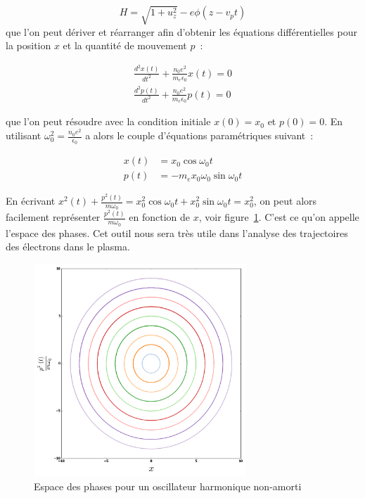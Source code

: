 \documentclass[a4paper]{book}
\begin{document}
\begin{equation}
    H=\sqrt{1+u_z^2}-e\phi(z-v_pt)
\end{equation}
que l'on peut dériver et réarranger afin d'obtenir les équations différentielles pour la position $x$ et la quantité de mouvement $p$~:

\begin{eqnarray}
        \frac{d^2x(t)}{dt^2} +\frac{n_0e^2}{m_e\epsilon_0}x(t)= 0\\
        \frac{d^2p(t)}{dt^2} +\frac{n_0e^2}{m_e\epsilon_0}p(t)= 0
\end{eqnarray}

que l'on peut résoudre avec la condition initiale $x(0)=x_0$ et $p(0)=0$. En utilisant $\omega_0^2=\frac{n_0e^2}{\epsilon_0}$ a alors le couple d'équations paramétriques suivant~:

\begin{eqnarray}
       x(t)&=x_0\cos{\omega_0 t} \\
       p(t)&=-m_ex_0\omega_0\sin{\omega_0 t}
\end{eqnarray}

En écrivant $x^2(t)+\frac{p^2(t)}{m\omega_0}=x_0^2\cos{\omega_0t}+x_0^2\sin{\omega_0t}=x_0^2$, on peut alors facilement représenter $\frac{p^2(t)}{m\omega_0}$ en fonction de $x$, voir figure~\ref{fig:espace_phases}. C'est ce qu'on appelle l'espace des phases. Cet outil nous sera très utile dans l'analyse des trajectoires des électrons dans le plasma. 


\begin{figure}[!htbp]
\begin{center}
\includegraphics[width=8cm]{simple_phase_space.png}
\end{center}
\caption{Espace des phases pour un oscillateur harmonique non-amorti}
\label{fig:espace_phases}
\end{figure}
\end{document}
